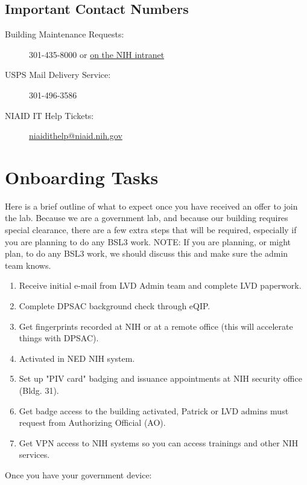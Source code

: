 \documentclass[10pt, letterpaper, twocolumn]{article} %
\begin{document}
\subsection{Important Contact Numbers}
\begin{description}
\item [Building Maintenance Requests:] 301-435-8000 or \href{https://www.orf.od.nih.gov/PropertyManagement/MaintenanceServiceRequests/Pages/default.aspx}{on the NIH intranet}
\item [USPS Mail Delivery Service:] 301-496-3586
\item [NIAID IT Help Tickets:] \href{mailto:niaidithelp@niaid.nih.gov}{niaidithelp@niaid.nih.gov}

\end{description}

\section{Onboarding Tasks}
Here is a brief outline of what to expect once you have received an offer to join the lab. Because we are a government lab, and because our building requires special clearance, there are a few extra steps that will be required, especially if you are planning to do any BSL3 work.
NOTE: If you are planning, or might plan, to do any BSL3 work, we should discuss this and make sure the admin team knows.
\begin{enumerate}
\item Receive initial e-mail from LVD Admin team and complete LVD paperwork.
\item Complete DPSAC background check through eQIP.
\item Get fingerprints recorded at NIH or at a remote office (this will accelerate things with DPSAC).
\item Activated in NED NIH system.
\item Set up "PIV card" badging and issuance appointments at NIH security office (Bldg. 31).
\item Get badge access to the building activated, Patrick or LVD admins must request from Authorizing Official (AO).
\item Get VPN access to NIH systems so you can access trainings and other NIH services.
\end{enumerate}
Once you have your government device:
\end{document}
